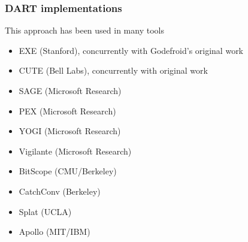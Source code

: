 \documentclass[10pt,xcolor={dvipsnames}]{beamer}
\begin{document}
\begin{frame}[fragile]

\frametitle{DART implementations}

This approach has been used in many tools
\begin{itemize}
\item EXE (Stanford), concurrently with Godefroid's original work \\[0.5em]
\item CUTE (Bell Labs), concurrently with original work \\[0.5em]
\item SAGE (Microsoft Research) \\[0.5em]
\item PEX (Microsoft Research) \\[0.5em]
\item YOGI (Microsoft Research) \\[0.5em]
\item Vigilante (Microsoft Research) \\[0.5em]
\item BitScope (CMU/Berkeley) \\[0.5em]
\item CatchConv (Berkeley) \\[0.5em]
\item Splat (UCLA) \\[0.5em]
\item Apollo (MIT/IBM) \\[0.5em]
\end{itemize}

\end{frame}
\end{document}
